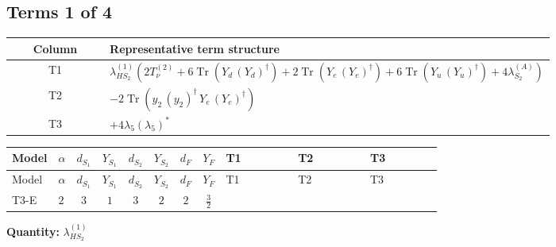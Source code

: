 \documentclass[8pt]{article}
\begin{document}
\begin{landscape}
\subsection*{Terms 1 of 4}
\begin{center}
\begin{tabular}{@{}c >{\raggedright\arraybackslash}p{0.82\linewidth}@{}}
\toprule
Column & Representative term structure \\
\midrule
T1 & \(\displaystyle {\lambda_{HS_2}^{(1)}} (2 T_{\nu}^{(2)}+6 \operatorname{Tr}\!\left({Y_d}\,\left({Y_d}\right)^{\dagger}\right)+2 \operatorname{Tr}\!\left({Y_e}\,\left({Y_e}\right)^{\dagger}\right)+6 \operatorname{Tr}\!\left({Y_u}\,\left({Y_u}\right)^{\dagger}\right)+4 {\lambda_{S_2}^{(A)}})\) \\
\midrule
T2 & \(\displaystyle -2 \operatorname{Tr}\!\left({y_2}\,\left({y_2}\right)^{\dagger}\,{Y_e}\,\left({Y_e}\right)^{\dagger}\right)\) \\
\midrule
T3 & \(\displaystyle +4 {\lambda_5} \left({\lambda_5}\right)^{*}\) \\
\midrule
\bottomrule
\end{tabular}
\end{center}
\smallskip
\tiny
\begin{longtable}{@{}llcccccc >{\raggedright\arraybackslash}p{0.21\linewidth} >{\raggedright\arraybackslash}p{0.21\linewidth} >{\raggedright\arraybackslash}p{0.21\linewidth}@{}}
\toprule
Model & $\alpha$ & $d_{S_1}$ & $Y_{S_1}$ & $d_{S_2}$ & $Y_{S_2}$ & $d_F$ & $Y_F$ & T1 & T2 & T3 \\
\midrule
\endfirsthead
\toprule
Model & $\alpha$ & $d_{S_1}$ & $Y_{S_1}$ & $d_{S_2}$ & $Y_{S_2}$ & $d_F$ & $Y_F$ & T1 & T2 & T3 \\
\midrule
\endhead
T3-E & $2$ & $3$ & $1$ & $3$ & $2$ & $2$ & $\frac{3}{2}$ & \scriptsize\adjustbox{max width=\linewidth}{$\begin{gathered} {\lambda_{HS_2}^{(1)}} (2 T_{\nu}^{(2)}+6 \operatorname{Tr}\!\left({Y_d}\,\left({Y_d}\right)^{\dagger}\right)+2 \operatorname{Tr}\!\left({Y_e}\,\left({Y_e}\right)^{\dagger}\right)+6 \operatorname{Tr}\!\left({Y_u}\,\left({Y_u}\right)^{\dagger}\right)+4 {\lambda_{S_2}^{(A)}})\end{gathered}$} & \scriptsize\adjustbox{max width=\linewidth}{$\begin{gathered} -2 \operatorname{Tr}\!\left({y_2}\,\left({y_2}\right)^{\dagger}\,{Y_e}\,\left({Y_e}\right)^{\dagger}\right)\end{gathered}$} & \scriptsize\adjustbox{max width=\linewidth}{$\begin{gathered} +4 {\lambda_5} \left({\lambda_5}\right)^{*}\end{gathered}$} \\
\midrule
\bottomrule
\end{longtable}
\clearpage
\noindent\textbf{Quantity: }$\lambda_{HS_2}^{(1)}$\par\smallskip

\end{landscape}
\end{document}
